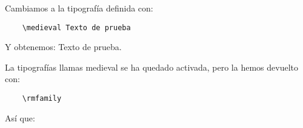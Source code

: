 

Cambiamos a la tipografía definida con:

\begin{verbatim}
    \medieval Texto de prueba
\end{verbatim}

Y obtenemos:
\medieval Texto de prueba.

\rmfamily
La tipografías llamas {\medieval medieval} se ha quedado activada, pero la hemos devuelto con: 

\begin{verbatim}
    \rmfamily
\end{verbatim}


Así que:

\blindtext[1-2]